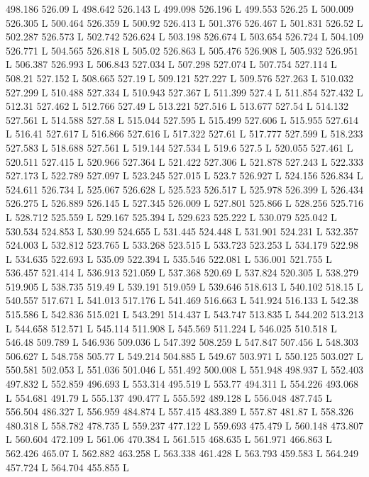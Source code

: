 498.186 526.09 L
498.642 526.143 L
499.098 526.196 L
499.553 526.25 L
500.009 526.305 L
500.464 526.359 L
500.92 526.413 L
501.376 526.467 L
501.831 526.52 L
502.287 526.573 L
502.742 526.624 L
503.198 526.674 L
503.654 526.724 L
504.109 526.771 L
504.565 526.818 L
505.02 526.863 L
505.476 526.908 L
505.932 526.951 L
506.387 526.993 L
506.843 527.034 L
507.298 527.074 L
507.754 527.114 L
508.21 527.152 L
508.665 527.19 L
509.121 527.227 L
509.576 527.263 L
510.032 527.299 L
510.488 527.334 L
510.943 527.367 L
511.399 527.4 L
511.854 527.432 L
512.31 527.462 L
512.766 527.49 L
513.221 527.516 L
513.677 527.54 L
514.132 527.561 L
514.588 527.58 L
515.044 527.595 L
515.499 527.606 L
515.955 527.614 L
516.41 527.617 L
516.866 527.616 L
517.322 527.61 L
517.777 527.599 L
518.233 527.583 L
518.688 527.561 L
519.144 527.534 L
519.6 527.5 L
520.055 527.461 L
520.511 527.415 L
520.966 527.364 L
521.422 527.306 L
521.878 527.243 L
522.333 527.173 L
522.789 527.097 L
523.245 527.015 L
523.7 526.927 L
524.156 526.834 L
524.611 526.734 L
525.067 526.628 L
525.523 526.517 L
525.978 526.399 L
526.434 526.275 L
526.889 526.145 L
527.345 526.009 L
527.801 525.866 L
528.256 525.716 L
528.712 525.559 L
529.167 525.394 L
529.623 525.222 L
530.079 525.042 L
530.534 524.853 L
530.99 524.655 L
531.445 524.448 L
531.901 524.231 L
532.357 524.003 L
532.812 523.765 L
533.268 523.515 L
533.723 523.253 L
534.179 522.98 L
534.635 522.693 L
535.09 522.394 L
535.546 522.081 L
536.001 521.755 L
536.457 521.414 L
536.913 521.059 L
537.368 520.69 L
537.824 520.305 L
538.279 519.905 L
538.735 519.49 L
539.191 519.059 L
539.646 518.613 L
540.102 518.15 L
540.557 517.671 L
541.013 517.176 L
541.469 516.663 L
541.924 516.133 L
542.38 515.586 L
542.836 515.021 L
543.291 514.437 L
543.747 513.835 L
544.202 513.213 L
544.658 512.571 L
545.114 511.908 L
545.569 511.224 L
546.025 510.518 L
546.48 509.789 L
546.936 509.036 L
547.392 508.259 L
547.847 507.456 L
548.303 506.627 L
548.758 505.77 L
549.214 504.885 L
549.67 503.971 L
550.125 503.027 L
550.581 502.053 L
551.036 501.046 L
551.492 500.008 L
551.948 498.937 L
552.403 497.832 L
552.859 496.693 L
553.314 495.519 L
553.77 494.311 L
554.226 493.068 L
554.681 491.79 L
555.137 490.477 L
555.592 489.128 L
556.048 487.745 L
556.504 486.327 L
556.959 484.874 L
557.415 483.389 L
557.87 481.87 L
558.326 480.318 L
558.782 478.735 L
559.237 477.122 L
559.693 475.479 L
560.148 473.807 L
560.604 472.109 L
561.06 470.384 L
561.515 468.635 L
561.971 466.863 L
562.426 465.07 L
562.882 463.258 L
563.338 461.428 L
563.793 459.583 L
564.249 457.724 L
564.704 455.855 L
